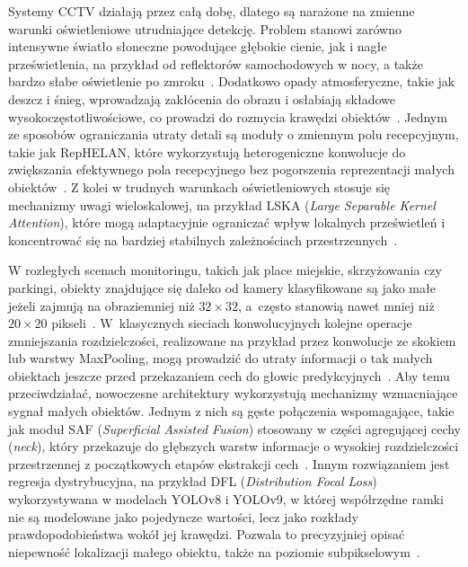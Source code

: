 Systemy CCTV działają przez całą dobę, dlatego są narażone na zmienne warunki oświetleniowe
utrudniające detekcję. Problem stanowi zarówno intensywne światło słoneczne powodujące głębokie
cienie, jak i nagłe prześwietlenia, na przykład od reflektorów samochodowych w nocy, a także bardzo
słabe oświetlenie po zmroku~\cite{nikouei2025}. Dodatkowo opady atmosferyczne, takie jak deszcz i
śnieg, wprowadzają zakłócenia do obrazu i osłabiają składowe wysokoczęstotliwościowe, co prowadzi
do rozmycia krawędzi obiektów~\cite{wille2026}. Jednym ze sposobów ograniczania utraty detali są
moduły o zmiennym polu recepcyjnym, takie jak RepHELAN, które wykorzystują heterogeniczne
konwolucje do zwiększania efektywnego pola recepcyjnego bez pogorszenia reprezentacji małych
obiektów~\cite{yang2024}. Z kolei w trudnych warunkach oświetleniowych stosuje się mechanizmy uwagi
wieloskalowej, na przykład LSKA (\textit{Large Separable Kernel Attention}), które mogą
adaptacyjnie ograniczać wpływ lokalnych prześwietleń i koncentrować się na bardziej stabilnych
zależnościach przestrzennych~\cite{tang2026}.

W rozległych scenach monitoringu, takich jak place miejskie, skrzyżowania czy parkingi, obiekty
znajdujące się daleko od kamery klasyfikowane są jako małe jeżeli zajmują na obraziemniej niż $32
  \times 32$, a~często stanowią nawet mniej niż $20 \times 20$ pikseli~\cite{nikouei2025}.
W~klasycznych sieciach konwolucyjnych kolejne operacje zmniejszania rozdzielczości, realizowane na
przykład przez konwolucje ze skokiem lub warstwy MaxPooling, mogą prowadzić do utraty informacji o
tak małych obiektach jeszcze przed przekazaniem cech do głowic predykcyjnych~\cite{nikouei2025}.
Aby temu przeciwdziałać, nowoczesne architektury wykorzystują mechanizmy wzmacniające sygnał małych
obiektów. Jednym z nich są gęste połączenia wspomagające, takie jak moduł SAF (\textit{Superficial
  Assisted Fusion}) stosowany w części agregującej cechy (\textit{neck}), który przekazuje do
głębszych warstw informacje o wysokiej rozdzielczości przestrzennej z początkowych etapów
ekstrakcji cech~\cite{yang2024}. Innym rozwiązaniem jest regresja dystrybucyjna, na przykład DFL
(\textit{Distribution Focal Loss}) wykorzystywana w modelach YOLOv8 i YOLOv9, w której współrzędne
ramki nie są modelowane jako pojedyncze wartości, lecz jako rozkłady prawdopodobieństwa wokół jej
krawędzi. Pozwala to precyzyjniej opisać niepewność lokalizacji małego obiektu, także na poziomie
subpikselowym~\cite{yang2024}.

